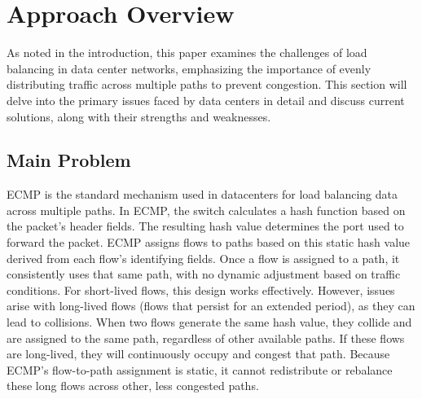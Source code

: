 \documentclass[11pt, sigconf]{acmart}
\begin{document}
\section{Approach Overview}
As noted in the introduction, this paper examines the challenges of load balancing in data center networks, emphasizing the importance of evenly distributing traffic across multiple paths to prevent congestion. This section will delve into the primary issues faced by data centers in detail and discuss current solutions, along with their strengths and weaknesses.

\subsection{Main Problem}

ECMP is the standard mechanism used in datacenters for load balancing data across multiple paths. In ECMP, the switch calculates a hash function based on the packet’s header fields. The resulting hash value determines the port used to forward the packet. ECMP assigns flows to paths based on this static hash value derived from each flow’s identifying fields. Once a flow is assigned to a path, it consistently uses that same path, with no dynamic adjustment based on traffic conditions. For short-lived flows, this design works effectively. However, issues arise with long-lived flows (flows that persist for an extended period), as they can lead to collisions. When two flows generate the same hash value, they collide and are assigned to the same path, regardless of other available paths. If these flows are long-lived, they will continuously occupy and congest that path. Because ECMP’s flow-to-path assignment is static, it cannot redistribute or rebalance these long flows across other, less congested paths.

\begin{comment}
Journals use one of three template styles. All but three ACM journals
use the {\verb|acmsmall|} template style:
\begin{itemize}
\item {\texttt{acmsmall}}: The default journal template style.
\item {\texttt{acmlarge}}: Used by JOCCH and TAP.
\item {\texttt{acmtog}}: Used by TOG.
\end{itemize}

The majority of conference proceedings documentation will use the {\verb|acmconf|} template style.
\begin{itemize}
\item {\texttt{acmconf}}: The default proceedings template style.
\item{\texttt{sigchi}}: Used for SIGCHI conference articles.
\item{\texttt{sigplan}}: Used for SIGPLAN conference articles.
\end{itemize}
\end{comment}
\end{document}
